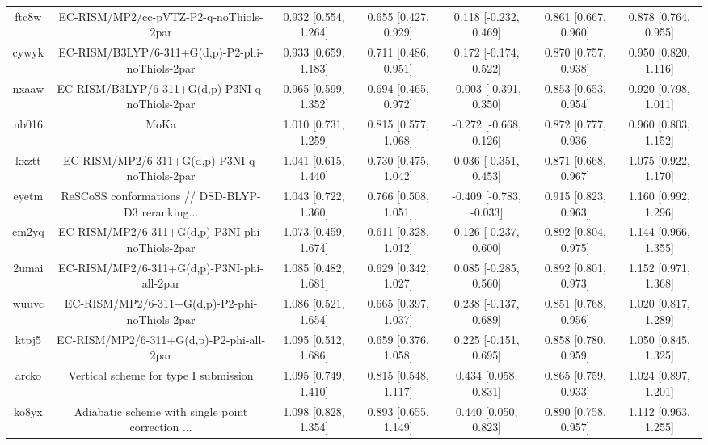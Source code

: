 \documentclass{article}
\begin{document}
\begin{center}
\begin{longtable}{|ccccccc|}
 ftc8w &             EC-RISM/MP2/cc-pVTZ-P2-q-noThiols-2par &  0.932 [0.554, 1.264] &  0.655 [0.427, 0.929] &    0.118 [-0.232, 0.469] &  0.861 [0.667, 0.960] &   0.878 [0.764, 0.955] \\
 cywyk &    EC-RISM/B3LYP/6-311+G(d,p)-P2-phi-noThiols-2par &  0.933 [0.659, 1.183] &  0.711 [0.486, 0.951] &    0.172 [-0.174, 0.522] &  0.870 [0.757, 0.938] &   0.950 [0.820, 1.116] \\
 nxaaw &    EC-RISM/B3LYP/6-311+G(d,p)-P3NI-q-noThiols-2par &  0.965 [0.599, 1.352] &  0.694 [0.465, 0.972] &   -0.003 [-0.391, 0.350] &  0.853 [0.653, 0.954] &   0.920 [0.798, 1.011] \\
 nb016 &                                               MoKa &  1.010 [0.731, 1.259] &  0.815 [0.577, 1.068] &   -0.272 [-0.668, 0.126] &  0.872 [0.777, 0.936] &   0.960 [0.803, 1.152] \\
 kxztt &      EC-RISM/MP2/6-311+G(d,p)-P3NI-q-noThiols-2par &  1.041 [0.615, 1.440] &  0.730 [0.475, 1.042] &    0.036 [-0.351, 0.453] &  0.871 [0.668, 0.967] &   1.075 [0.922, 1.170] \\
 eyetm &  ReSCoSS conformations // DSD-BLYP-D3 reranking... &  1.043 [0.722, 1.360] &  0.766 [0.508, 1.051] &  -0.409 [-0.783, -0.033] &  0.915 [0.823, 0.963] &   1.160 [0.992, 1.296] \\
 cm2yq &    EC-RISM/MP2/6-311+G(d,p)-P3NI-phi-noThiols-2par &  1.073 [0.459, 1.674] &  0.611 [0.328, 1.012] &    0.126 [-0.237, 0.600] &  0.892 [0.804, 0.975] &   1.144 [0.966, 1.355] \\
 2umai &         EC-RISM/MP2/6-311+G(d,p)-P3NI-phi-all-2par &  1.085 [0.482, 1.681] &  0.629 [0.342, 1.027] &    0.085 [-0.285, 0.560] &  0.892 [0.801, 0.973] &   1.152 [0.971, 1.368] \\
 wuuvc &      EC-RISM/MP2/6-311+G(d,p)-P2-phi-noThiols-2par &  1.086 [0.521, 1.654] &  0.665 [0.397, 1.037] &    0.238 [-0.137, 0.689] &  0.851 [0.768, 0.956] &   1.020 [0.817, 1.289] \\
 ktpj5 &           EC-RISM/MP2/6-311+G(d,p)-P2-phi-all-2par &  1.095 [0.512, 1.686] &  0.659 [0.376, 1.058] &    0.225 [-0.151, 0.695] &  0.858 [0.780, 0.959] &   1.050 [0.845, 1.325] \\
 arcko &              Vertical scheme for type I submission &  1.095 [0.749, 1.410] &  0.815 [0.548, 1.117] &     0.434 [0.058, 0.831] &  0.865 [0.759, 0.933] &   1.024 [0.897, 1.201] \\
 ko8yx &  Adiabatic scheme with single point correction ... &  1.098 [0.828, 1.354] &  0.893 [0.655, 1.149] &     0.440 [0.050, 0.823] &  0.890 [0.758, 0.957] &   1.112 [0.963, 1.255] \\

\end{longtable}
\end{center}
\end{document}
